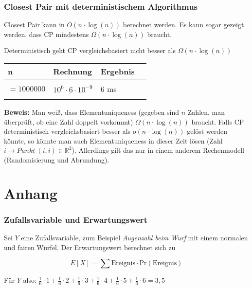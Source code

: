\documentclass{scrartcl}%
\begin{document}
    \subsubsection*{Closest Pair mit deterministischem Algorithmus}
    \label{subsec:closestPairmitdeterministischemAlgorithmus}
    Closest Pair kann in $O(n \cdot \log(n))$ berechnet werden.
    Es kann sogar gezeigt werden, dass CP mindestens $\Omega(n \cdot \log(n))$ braucht.

    Deterministisch geht CP vergleichsbasiert nicht besser als $\Omega(n \cdot \log(n))$

    \begin{table}[!ht]
        \centering
        \begin{tabular}{llll}
            \textbf{\textsf{n}} & \textbf{\textsf{Rechnung}} & \textbf{\textsf{Ergebnis}}\\
            \hline \\ [-2ex]
            $=1000000   $ & $10^6 \cdot 6 \cdot  10^{-9}$   & 6 ms \\
            \hline \\
        \end{tabular}
    \end{table}

    \vspace*{0.3cm} \textbf{\textsf{Beweis:}}
        Man weiß, dass Elementuniqueness (gegeben sind $n$ Zahlen, man überprüft, ob eine Zahl doppelt vorkommt)
        $\Omega(n \cdot \log(n))$ braucht.
        Falls CP deterministisch vergleichsbasiert besser als $o(n \cdot \log(n))$
        gelöst werden könnte, so könnte man auch Elementuniqueness in dieser Zeit lösen
        (Zahl $i \rightarrow Punkt \ (i, i) \in \mathbb{R}^2$). Allerdings gilt das nur in einem
        anderem Rechenmodell (Randomisierung und Abrundung).

    \hrulefill

    \section*{Anhang}
    \label{sec:anhang}

    \subsubsection*{Zufallsvariable und Erwartungswert}
    \label{sec:zufallsvariableUndErwartungswert}
    Sei $Y$ eine Zufallsvariable, zum Beispiel \textit{Augenzahl beim Wurf} mit einem normalen und fairen Würfel. \newline
    Der Erwartungswert berechnet sich zu

    \begin{equation*}
        E[X] = \sum \text{Ereignis} \cdot \text{Pr}(\text{Ereignis})
    \end{equation*}

    Für $Y$ also: $\frac{1}{6} \cdot 1 + \frac{1}{6} \cdot 2 + \frac{1}{6} \cdot 3 +
    \frac{1}{6} \cdot 4 + \frac{1}{6} \cdot 5 + \frac{1}{6} \cdot 6 = 3,5$
\end{document}
